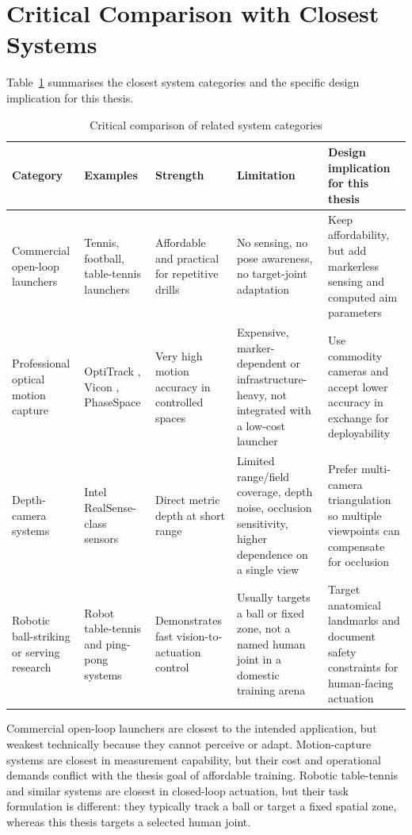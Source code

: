 \section{Critical Comparison with Closest Systems}

Table~\ref{tab:2_1} summarises the closest system categories and the specific design implication for this thesis.

\begin{table}[htbp]
\centering
\small
\caption{Critical comparison of related system categories}
\label{tab:2_1}
\begin{tabularx}{\textwidth}{|p{2.4cm}|p{2.8cm}|p{2.5cm}|X|X|}
\hline
\textbf{Category} & \textbf{Examples} & \textbf{Strength} & \textbf{Limitation} & \textbf{Design implication for this thesis} \\
\hline
Commercial open-loop launchers & Tennis, football, table-tennis launchers & Affordable and practical for repetitive drills & No sensing, no pose awareness, no target-joint adaptation & Keep affordability, but add markerless sensing and computed aim parameters \\
\hline
Professional optical motion capture & OptiTrack \cite{ref30}, Vicon \cite{ref8}, PhaseSpace \cite{ref31} & Very high motion accuracy in controlled spaces & Expensive, marker-dependent or infrastructure-heavy, not integrated with a low-cost launcher & Use commodity cameras and accept lower accuracy in exchange for deployability \\
\hline
Depth-camera systems & Intel RealSense-class sensors \cite{ref32} & Direct metric depth at short range & Limited range/field coverage, depth noise, occlusion sensitivity, higher dependence on a single view & Prefer multi-camera triangulation so multiple viewpoints can compensate for occlusion \\
\hline
Robotic ball-striking or serving research & Robot table-tennis and ping-pong systems \cite{ref24, ref25} & Demonstrates fast vision-to-actuation control & Usually targets a ball or fixed zone, not a named human joint in a domestic training arena & Target anatomical landmarks and document safety constraints for human-facing actuation \\
\hline
\end{tabularx}
\end{table}

Commercial open-loop launchers are closest to the intended application, but weakest technically because they cannot perceive or adapt. Motion-capture systems are closest in measurement capability, but their cost and operational demands conflict with the thesis goal of affordable training. Robotic table-tennis and similar systems are closest in closed-loop actuation, but their task formulation is different: they typically track a ball or target a fixed spatial zone, whereas this thesis targets a selected human joint.

